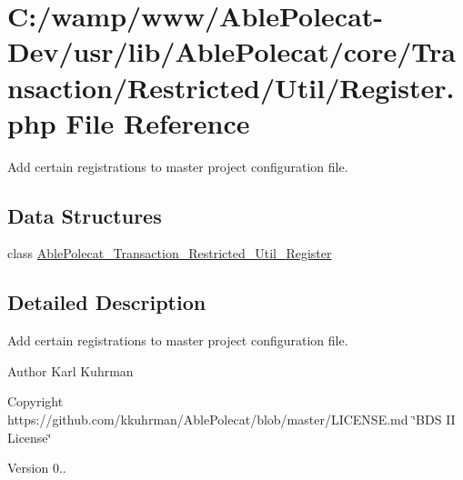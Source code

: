 \hypertarget{_register_8php}{}\section{C\+:/wamp/www/\+Able\+Polecat-\/\+Dev/usr/lib/\+Able\+Polecat/core/\+Transaction/\+Restricted/\+Util/\+Register.php File Reference}
\label{_register_8php}


Add certain registrations to master project configuration file.  


\subsection*{Data Structures}
\begin{DoxyCompactItemize}
\item 
class \hyperlink{class_able_polecat___transaction___restricted___util___register}{Able\+Polecat\+\_\+\+Transaction\+\_\+\+Restricted\+\_\+\+Util\+\_\+\+Register}
\end{DoxyCompactItemize}


\subsection{Detailed Description}
Add certain registrations to master project configuration file. 

\begin{DoxyAuthor}{Author}
Karl Kuhrman 
\end{DoxyAuthor}
\begin{DoxyCopyright}{Copyright}
https\+://github.com/kkuhrman/\+Able\+Polecat/blob/master/\+L\+I\+C\+E\+N\+S\+E.\+md \char`\"{}\+B\+D\+S I\+I License\char`\"{} 
\end{DoxyCopyright}
\begin{DoxyVersion}{Version}
0.. 
\end{DoxyVersion}
